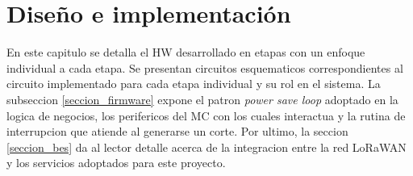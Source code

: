 \chapter{Diseño e implementación} %
\label{Chapter3} %
En este capitulo se detalla el HW desarrollado en etapas con un enfoque individual a cada etapa. Se presentan circuitos esquematicos correspondientes al circuito implementado para cada etapa individual y su rol en el sistema. 
La subseccion \ref{seccion_firmware} expone el patron \textit{power save loop} adoptado en la logica de negocios, los perifericos del MC con los cuales interactua y la rutina de interrupcion que atiende al generarse un corte.
Por ultimo, la seccion \ref{seccion_bes} da al lector detalle acerca de la integracion entre la red LoRaWAN y los servicios adoptados para este proyecto.


